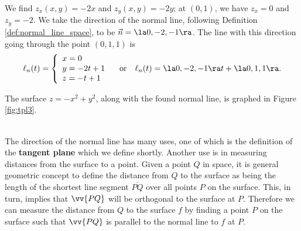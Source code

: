 {We find $z_x(x,y) = -2x$ and $z_y(x,y) = -2y$; at $(0,1)$, we have $z_x = 0$ and $z_y = -2$. We take the direction of the normal line, following Definition \ref{def:normal_line_space}, to be $\vec n=\la 0,-2,-1\ra$. The line with this direction going through the point $(0,1,1)$ is 
$$\ell_n(t) = \left\{\begin{array}{l} x=0\\y=-2t+1\\z=-t+1\end{array}\right.\quad \text{or}\quad \ell_n(t)=\la 0,-2,-1\ra t+\la 0,1,1\ra.$$


The surface $z=-x^2+y^2$, along with the found normal line, is graphed in Figure \ref{fig:tpl3}. 
}\\

The direction of the normal line has many uses, one of which is the definition of the \textbf{tangent plane} which we define shortly. Another use is in measuring distances from the surface to a point. Given a point $Q$ in space, it is general geometric concept to define the distance from $Q$ to the surface as being the length of the shortest line segment $\overline{PQ}$ over all points $P$ on the surface. This, in turn, implies that $\vv{PQ}$ will be orthogonal to the surface at $P$. Therefore we can measure the distance from $Q$ to the surface $f$ by finding a point $P$ on the surface such that $\vv{PQ}$ is parallel to the normal line to $f$ at $P$.\\

